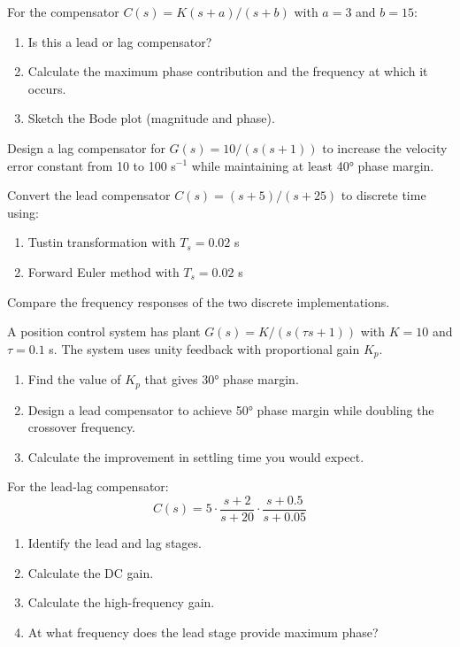 \begin{exercise}
For the compensator $C(s) = K(s+a)/(s+b)$ with $a = 3$ and $b = 15$:
\begin{enumerate}
    \item Is this a lead or lag compensator?
    \item Calculate the maximum phase contribution and the frequency at which it occurs.
    \item Sketch the Bode plot (magnitude and phase).
\end{enumerate}
\end{exercise}

\begin{exercise}
Design a lag compensator for $G(s) = 10/(s(s+1))$ to increase the velocity error constant from 10 to 100 s$^{-1}$ while maintaining at least 40° phase margin.
\end{exercise}

\begin{exercise}
Convert the lead compensator $C(s) = (s+5)/(s+25)$ to discrete time using:
\begin{enumerate}
    \item Tustin transformation with $T_s = 0.02$ s
    \item Forward Euler method with $T_s = 0.02$ s
\end{enumerate}
Compare the frequency responses of the two discrete implementations.
\end{exercise}

\begin{exercise}
A position control system has plant $G(s) = K/(s(\tau s + 1))$ with $K = 10$ and $\tau = 0.1$ s. The system uses unity feedback with proportional gain $K_p$.
\begin{enumerate}
    \item Find the value of $K_p$ that gives 30° phase margin.
    \item Design a lead compensator to achieve 50° phase margin while doubling the crossover frequency.
    \item Calculate the improvement in settling time you would expect.
\end{enumerate}
\end{exercise}

\begin{exercise}
For the lead-lag compensator:
\[
C(s) = 5 \cdot \frac{s+2}{s+20} \cdot \frac{s+0.5}{s+0.05}
\]
\begin{enumerate}
    \item Identify the lead and lag stages.
    \item Calculate the DC gain.
    \item Calculate the high-frequency gain.
    \item At what frequency does the lead stage provide maximum phase?
\end{enumerate}
\end{exercise}

